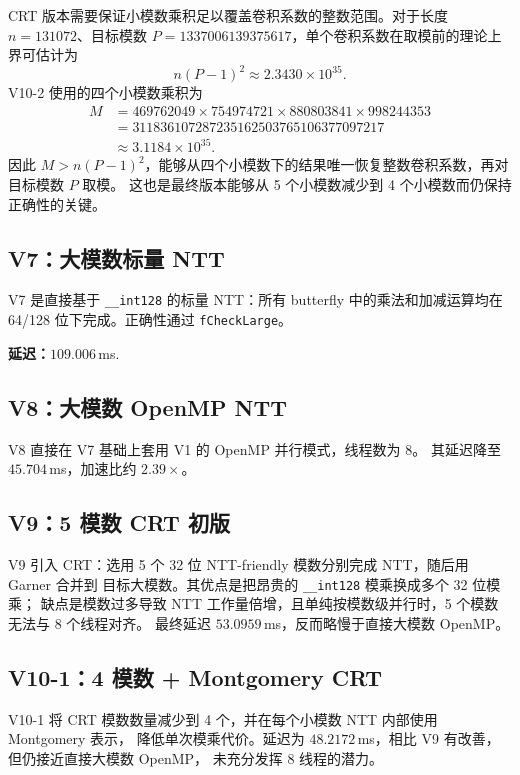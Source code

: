 \documentclass[UTF8,a4paper,10pt]{ctexart}
\begin{document}
CRT 版本需要保证小模数乘积足以覆盖卷积系数的整数范围。对于长度 $n=131072$、目标模数
$P=1337006139375617$，单个卷积系数在取模前的理论上界可估计为
\[
  n(P-1)^2 \approx 2.3430\times 10^{35}.
\]
V10-2 使用的四个小模数乘积为
\[
\begin{aligned}
M &= 469762049 \times 754974721 \times 880803841 \times 998244353\\
  &= 311836107287235162503765106377097217 \\
  &\approx 3.1184\times 10^{35}.
\end{aligned}
\]
因此 $M > n(P-1)^2$，能够从四个小模数下的结果唯一恢复整数卷积系数，再对目标模数 $P$ 取模。
这也是最终版本能够从 5 个小模数减少到 4 个小模数而仍保持正确性的关键。

\subsection{V7：大模数标量 NTT}

V7 是直接基于 \texttt{\_\_int128} 的标量 NTT：所有 butterfly 中的乘法和加减运算均在
64/128 位下完成。正确性通过 \texttt{fCheckLarge}。

\noindent\textbf{延迟：}\;$109.006$\,ms.

\subsection{V8：大模数 OpenMP NTT}

V8 直接在 V7 基础上套用 V1 的 OpenMP 并行模式，线程数为 8。
其延迟降至 $45.704$\,ms，加速比约 $2.39\times$。

\subsection{V9：5 模数 CRT 初版}

V9 引入 CRT：选用 5 个 32 位 NTT-friendly 模数分别完成 NTT，随后用 Garner 合并到
目标大模数。其优点是把昂贵的 \texttt{\_\_int128} 模乘换成多个 32 位模乘；
缺点是模数过多导致 NTT 工作量倍增，且单纯按模数级并行时，5 个模数无法与 8 个线程对齐。
最终延迟 $53.0959$\,ms，反而略慢于直接大模数 OpenMP。

\subsection{V10-1：4 模数 + Montgomery CRT}

V10-1 将 CRT 模数数量减少到 4 个，并在每个小模数 NTT 内部使用 Montgomery 表示，
降低单次模乘代价。延迟为 $48.2172$\,ms，相比 V9 有改善，但仍接近直接大模数 OpenMP，
未充分发挥 8 线程的潜力。
\end{document}

